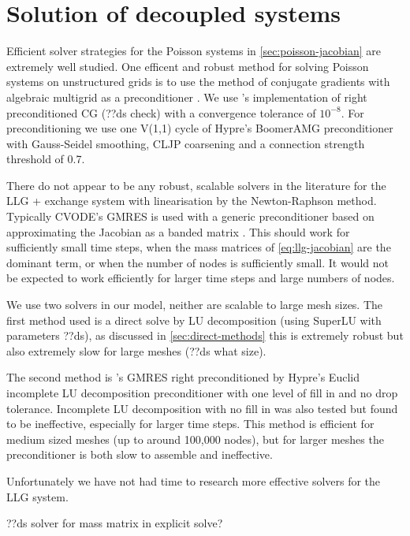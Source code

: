 \section{Solution of decoupled systems}
\label{sec:llg-only-system}

Efficient solver strategies for the Poisson systems in \cref{sec:poisson-jacobian} are extremely well studied.
One efficent and robust method for solving Poisson systems on unstructured grids is to use the method of conjugate gradients with algebraic multigrid as a preconditioner \cite[Chap. 2]{HowardElmanDavidSilvester2006}.
We use \oomph's implementation of right preconditioned CG (??ds check) with a convergence tolerance of $10^{-8}$.
For preconditioning we use one V(1,1) cycle of Hypre's BoomerAMG preconditioner \cite{hypre} with Gauss-Seidel smoothing, CLJP coarsening and a connection strength threshold of 0.7.


There do not appear to be any robust, scalable solvers in the literature for the LLG + exchange system with linearisation by the Newton-Raphson method.
Typically CVODE's GMRES is used with a generic preconditioner based on approximating the Jacobian as a banded matrix \cite{nmag} \cite{Vasslios}.
This should work for sufficiently small time steps, \ie when the mass matrices of \cref{eq:llg-jacobian} are the dominant term, or when the number of nodes is sufficiently small.
It would not be expected to work efficiently for larger time steps and large numbers of nodes.

We use two solvers in our model, neither are scalable to large mesh sizes.
The first method used is a direct solve by LU decomposition (using SuperLU \cite{superlu} with parameters ??ds), as discussed in \cref{sec:direct-methods} this is extremely robust but also extremely slow for large meshes (??ds what size).

The second method is \oomph's GMRES right preconditioned by Hypre's Euclid incomplete LU decomposition preconditioner with one level of fill in and no drop tolerance.
Incomplete LU decomposition with no fill in was also tested but found to be ineffective, especially for larger time steps.
This method is efficient for medium sized meshes (up to around 100,000 nodes), but for larger meshes the preconditioner is both slow to assemble and ineffective.

Unfortunately we have not had time to research more effective solvers for the LLG system.


??ds solver for mass matrix in explicit solve?


